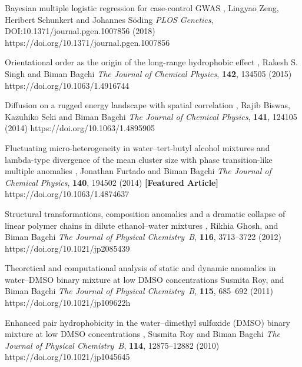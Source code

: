 


\begin{cvpubs}

%
        {Bayesian multiple logistic regression for case-control GWAS}
        {\selfauthor{}, Lingyao Zeng, Heribert Schunkert and Johannes S\"oding}
        {{\slshape PLOS Genetics}, DOI:10.1371/journal.pgen.1007856 (2018)}
        {https://doi.org/10.1371/journal.pgen.1007856}

%
        {Orientational order as the origin of the long-range hydrophobic effect}
        {\selfauthor{}, Rakesh S. Singh and Biman Bagchi}
        {{\slshape The Journal of Chemical Physics}, {\bfseries 142}, 134505 (2015)}
        {https://doi.org/10.1063/1.4916744}

%
        {Diffusion on a rugged energy landscape with spatial correlation}
        {\selfauthor{}, Rajib Biswas, Kazuhiko Seki and Biman Bagchi}
        {{\slshape The Journal of Chemical Physics}, {\bfseries 141}, 124105 (2014)}
        {https://doi.org/10.1063/1.4895905}


%
        {Fluctuating micro-heterogeneity in water--tert-butyl alcohol mixtures and
        lambda-type divergence of the mean cluster size with phase transition-like
        multiple anomalies}
        {\selfauthor{}, Jonathan Furtado and Biman Bagchi}
        {{\slshape The Journal of Chemical Physics}, {\bfseries 140}, 194502 (2014) {\bfseries [Featured Article]}}
        {https://doi.org/10.1063/1.4874637}

%
        {Structural transformations, composition anomalies and a dramatic
        collapse of linear polymer chains in dilute ethanol--water mixtures}
        {\selfauthor{}, Rikhia Ghosh, and Biman Bagchi}
        {{\slshape The Journal of Physical Chemistry~B}, {\bfseries 116}, 3713--3722 (2012)}
        {https://doi.org/10.1021/jp2085439}

%
        {Theoretical and computational analysis of static and dynamic anomalies
        in water--DMSO binary mixture at low DMSO concentrations}
        {Susmita Roy, \selfauthor{} and Biman Bagchi}
        {{\slshape The Journal of Physical Chemistry~B}, {\bfseries 115}, 685--692 (2011)}
        {https://doi.org/10.1021/jp109622h}

%
        {Enhanced pair hydrophobicity in the water--dimethyl sulfoxide (DMSO)
        binary mixture at low DMSO concentrations}
        {\selfauthor{}, Susmita Roy and Biman Bagchi}
        {{\slshape The Journal of Physical Chemistry~B}, {\bfseries 114}, 12875--12882 (2010)}
        {https://doi.org/10.1021/jp1045645}

\end{cvpubs}
